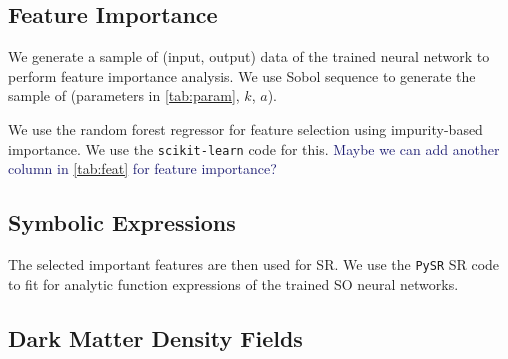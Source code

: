 \documentclass[modern, trackchanges, dvipsnames]{aastex631}
\newcommand{\YZ}[1]{\textcolor{MidnightBlue}{#1}}
\begin{document}
\subsection{Feature Importance}

We generate a sample of (input, output) data of the trained neural network to
perform feature importance analysis.
We use Sobol sequence to generate the sample of (parameters in
\autoref{tab:param}, $k$, $a$).

We use the random forest regressor for feature selection using impurity-based
importance.
We use the \texttt{scikit-learn} \citep{scikit-learn} code for this.
\YZ{Maybe we can add another column in \autoref{tab:feat} for feature
importance?}


\subsection{Symbolic Expressions}

The selected important features are then used for SR.
We use the \texttt{PySR} \citep{PySR} SR code to fit for analytic
function expressions of the trained SO neural networks.


\subsection{Dark Matter Density Fields}
\end{document}
